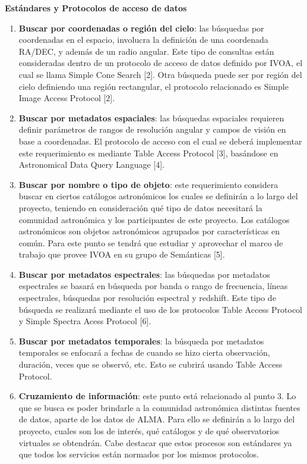 \textbf{Estándares y Protocolos de acceso de datos} \begin{enumerate} \item
\textbf{Buscar por coordenadas o región del cielo}: las búsquedas por
coordenadas en el espacio, involucra la definición de una coordenada RA/DEC, y
además de un radio angular. Este tipo de consultas están consideradas dentro de
un protocolo de acceso de datos definido por IVOA, el cual se llama Simple Cone
Search [2].  Otra búsqueda puede ser por región del cielo definiendo una región
rectangular, el protocolo relacionado es Simple Image Access Protocol [2].

	\item \textbf{Buscar por metadatos espaciales}: las búsquedas
espaciales requieren definir parámetros de rangos de resolución angular y
campos de visión en base a coordenadas. El protocolo de acceso con el cual se
deberá implementar este requerimiento es mediante Table Access Protocol [3],
basándose en Astronomical Data Query Language [4].

	\item \textbf{Buscar por nombre o tipo de objeto}: este requerimiento
considera buscar en ciertos catálogos astronómicos los cuales se definirán a lo
largo del proyecto, teniendo en consideración qué tipo de datos necesitará la
comunidad astronómica y los participantes de este proyecto. Los catálogos
astronómicos son objetos astronómicos agrupados por características en común.
Para este punto se tendrá que estudiar y aprovechar el marco de trabajo que
provee IVOA en su grupo de Semánticas [5].

	\item \textbf{Buscar por metadatos espectrales}: las búsquedas por
metadatos espectrales se basará en búsqueda por banda o rango de frecuencia,
líneas espectrales, búsquedas por resolución espectral y redshift. Este tipo de
búsqueda se realizará mediante el uso de los protocolos Table Access Protocol y
Simple Spectra Acess Protocol [6].

	\item \textbf{Buscar por metadatos temporales}: la búsqueda por
metadatos temporales se enfocará a fechas de cuando se hizo cierta observación,
duración, veces que se observó, etc. Esto se cubrirá usando Table Access
Protocol.

	\item \textbf{Cruzamiento de información}: este punto está relacionado
al punto 3. Lo que se busca es poder brindarle a la comunidad astronómica
distintas fuentes de datos, aparte de los datos de ALMA. Para ello se definirán
a lo largo del proyecto, cuales son los de interés, qué catálogos y de qué
observatorios virtuales se obtendrán. Cabe destacar que estos procesos son
estándares ya que todos los servicios están normados por los mismos protocolos.


\end{enumerate}
